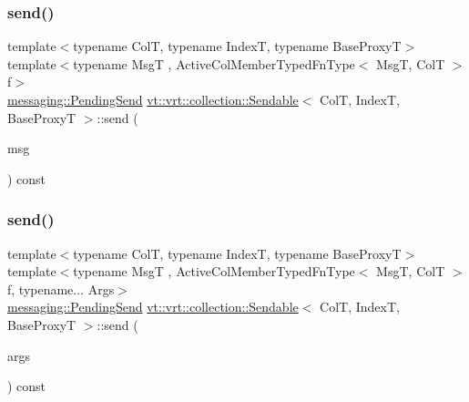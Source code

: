\mbox{\label{structvt_1_1vrt_1_1collection_1_1_sendable_aa8c102820895d01422c14e8c0993fc90}} 
\subsubsection{\texorpdfstring{send()}{send()}\hspace{0.1cm}{\footnotesize\ttfamily [5/6]}}
{\footnotesize\ttfamily template$<$typename ColT, typename IndexT, typename Base\+ProxyT$>$ \\
template$<$typename MsgT , Active\+Col\+Member\+Typed\+Fn\+Type$<$ Msg\+T, Col\+T $>$ f$>$ \\
\hyperlink{structvt_1_1messaging_1_1_pending_send}{messaging\+::\+Pending\+Send} \hyperlink{structvt_1_1vrt_1_1collection_1_1_sendable}{vt\+::vrt\+::collection\+::\+Sendable}$<$ ColT, IndexT, Base\+ProxyT $>$\+::send (\begin{DoxyParamCaption}\item[{\hyperlink{namespacevt_ab2b3d506ec8e8d1540aede826d84a239}{Msg\+Shared\+Ptr}$<$ MsgT $>$}]{msg }\end{DoxyParamCaption}) const}

\mbox{\label{structvt_1_1vrt_1_1collection_1_1_sendable_a65e5494a18b398b52f12c056cff1dc16}} 
\subsubsection{\texorpdfstring{send()}{send()}\hspace{0.1cm}{\footnotesize\ttfamily [6/6]}}
{\footnotesize\ttfamily template$<$typename ColT, typename IndexT, typename Base\+ProxyT$>$ \\
template$<$typename MsgT , Active\+Col\+Member\+Typed\+Fn\+Type$<$ Msg\+T, Col\+T $>$ f, typename... Args$>$ \\
\hyperlink{structvt_1_1messaging_1_1_pending_send}{messaging\+::\+Pending\+Send} \hyperlink{structvt_1_1vrt_1_1collection_1_1_sendable}{vt\+::vrt\+::collection\+::\+Sendable}$<$ ColT, IndexT, Base\+ProxyT $>$\+::send (\begin{DoxyParamCaption}\item[{Args \&\&...}]{args }\end{DoxyParamCaption}) const}



